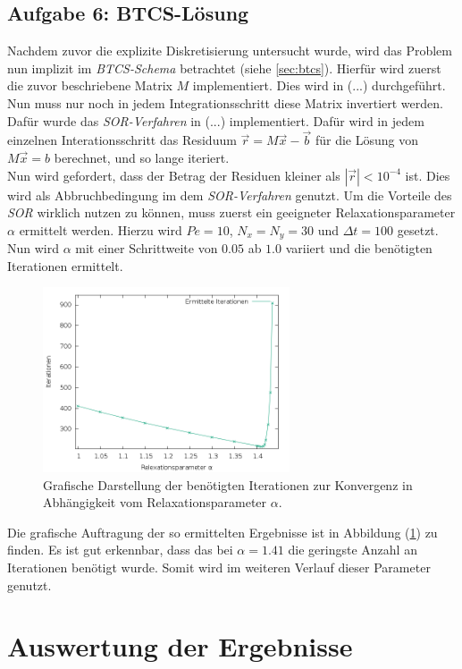 \documentclass[12pt,a4paper,titlepage,headinclude,bibtotoc]{scrartcl}
\begin{document}
\subsection{Aufgabe 6: BTCS-Lösung}
\label{sec:task6}
Nachdem zuvor die explizite Diskretisierung untersucht wurde, wird das Problem nun implizit im \textit{BTCS-Schema} betrachtet (siehe \ref{sec:btcs}). Hierfür wird zuerst die zuvor beschriebene Matrix $M$ implementiert. Dies wird in (...) durchgeführt. Nun muss nur noch in jedem Integrationsschritt diese Matrix invertiert werden. Dafür wurde das \textit{SOR-Verfahren} in (...) implementiert. Dafür wird in jedem einzelnen Interationsschritt das Residuum $\vec{r} = M \vec{x}-\vec{b}$ für die Lösung von $M \vec{x} = b$ berechnet, und so lange iteriert.\\
Nun wird gefordert, dass der Betrag der Residuen kleiner als $|\vec{r}| < 10^{-4}$ ist. Dies wird als Abbruchbedingung im dem \textit{SOR-Verfahren} genutzt. Um die Vorteile des \textit{SOR} wirklich nutzen zu können, muss zuerst ein geeigneter Relaxationsparameter $\alpha$ ermittelt werden. Hierzu wird $Pe=10$, $N_x=N_y = 30$ und $\Delta t=100$ gesetzt. Nun wird $\alpha$ mit einer Schrittweite von $0.05$ ab $1.0$ variiert und die benötigten Iterationen ermittelt. 
\begin{figure}[H]
 \centering
   \includegraphics[width=0.65\textwidth]{res/task6_sor_parameter.png}
   \caption{Grafische Darstellung der benötigten Iterationen zur Konvergenz in Abhängigkeit vom Relaxationsparameter $\alpha$.}
 \label{fig:task6_param_comp}
\end{figure}
Die grafische Auftragung der so ermittelten Ergebnisse ist in Abbildung (\ref{fig:task6_param_comp}) zu finden. Es ist gut erkennbar, dass das bei $\alpha=1.41$ die geringste Anzahl an Iterationen benötigt wurde. Somit wird im weiteren Verlauf dieser Parameter genutzt. 

\section{Auswertung der Ergebnisse}
\label{sec:interpretation}
\end{document}
